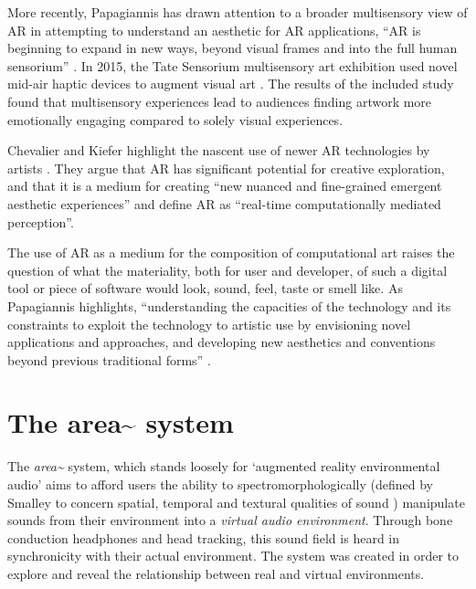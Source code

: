 More recently, Papagiannis has drawn attention to a broader multisensory view of AR in attempting to understand an aesthetic for AR applications, “AR is beginning to expand in new ways, beyond visual frames and into the full human sensorium” \citeyearpar{papagiannis2014}. In 2015, the Tate Sensorium multisensory art exhibition used novel mid-air haptic devices to augment visual art \citep{vi2017a}. The results of the included study found that multisensory experiences lead to audiences finding artwork more emotionally engaging compared to solely visual experiences.

Chevalier and Kiefer highlight the nascent use of newer AR technologies by artists \citeyearpar{chevalier2020}. They argue that AR has significant potential for creative exploration, and that it is a medium for creating “new nuanced and fine-grained emergent aesthetic experiences” and define AR as “real-time computationally mediated perception”.

The use of AR as a medium for the composition of computational art raises the question of what the materiality, both for user and developer, of such a digital tool or piece of software would look, sound, feel, taste or smell like. As Papagiannis highlights, “understanding the capacities of the technology and its constraints to exploit the technology to artistic use by envisioning novel applications and approaches, and developing new aesthetics and conventions beyond previous traditional forms” \citeyearpar{papagiannis2017}. 


\section{The area\textasciitilde{} system}      \label{sec: area-system}
The \textit{area\textasciitilde{}}  system, which stands loosely for ‘augmented reality environmental audio’ aims to afford users the ability to spectromorphologically (defined by Smalley to concern spatial, temporal and textural qualities of sound \citeyearpar{smalley1997}) manipulate sounds from their environment into a \textit{virtual audio environment}. Through bone conduction headphones and head tracking, this sound field is heard in synchronicity with their actual environment. The system was created in order to explore and reveal the relationship between real and virtual environments.

